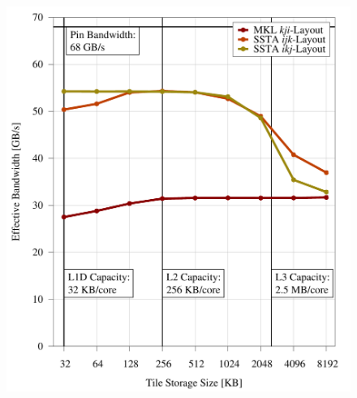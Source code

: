 \documentclass{sig-alternate-05-2015}
\begin{document}
\begin{figure}[!bth]
\begin{minipage}{0.49\textwidth}
    \includegraphics[width=0.99\columnwidth]{figures/post_tsb_tw_sweep_full_matrix_double_precision_production_cori_hsw_e5_2698_v3_08_31_2016_09_03_2016_16pus.pdf}
  \end{minipage}
\end{figure}
\end{document}
